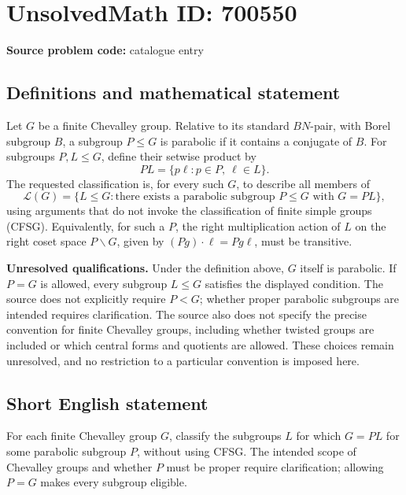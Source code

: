\documentclass[11pt]{article}
\begin{document}
\section*{UnsolvedMath ID: 700550}
\textbf{Source problem code:} catalogue entry
\subsection{Definitions and mathematical statement}
Let \(G\) be a finite Chevalley group. Relative to its standard \(BN\)-pair, with Borel subgroup \(B\), a subgroup \(P\leq G\) is parabolic if it contains a conjugate of \(B\). For subgroups \(P,L\leq G\), define their setwise product by
\[
PL=\{p\ell:p\in P,\ \ell\in L\}.
\]
The requested classification is, for every such \(G\), to describe all members of
\[
\mathcal{L}(G)=\{L\leq G:\text{there exists a parabolic subgroup }P\leq G\text{ with }G=PL\},
\]
using arguments that do not invoke the classification of finite simple groups (CFSG). Equivalently, for such a \(P\), the right multiplication action of \(L\) on the right coset space \(P\backslash G\), given by \((Pg)\cdot\ell=Pg\ell\), must be transitive.

\textbf{Unresolved qualifications.} Under the definition above, \(G\) itself is parabolic. If \(P=G\) is allowed, every subgroup \(L\leq G\) satisfies the displayed condition. The source does not explicitly require \(P<G\); whether proper parabolic subgroups are intended requires clarification. The source also does not specify the precise convention for finite Chevalley groups, including whether twisted groups are included or which central forms and quotients are allowed. These choices remain unresolved, and no restriction to a particular convention is imposed here.
\subsection{Short English statement}
For each finite Chevalley group \(G\), classify the subgroups \(L\) for which \(G=PL\) for some parabolic subgroup \(P\), without using CFSG. The intended scope of Chevalley groups and whether \(P\) must be proper require clarification; allowing \(P=G\) makes every subgroup eligible.
\end{document}
